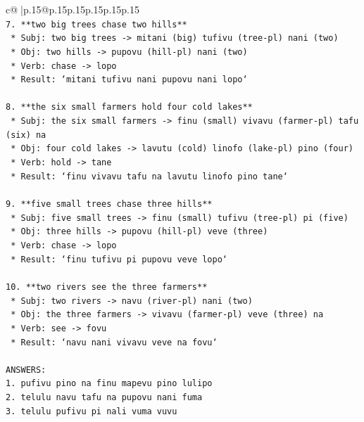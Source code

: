 \documentclass{article}
\begin{document}
{\begin{supertabular}{c@{$\;$}|p{.15\linewidth}@{}p{.15\linewidth}p{.15\linewidth}p{.15\linewidth}p{.15\linewidth}p{.15\linewidth}}
{{{\\ 
\texttt{7.  **two big trees chase two hills**} \\
\texttt{    *   Subj: two big trees {-}> mitani (big) tufivu (tree{-}pl) nani (two)} \\
\texttt{    *   Obj: two hills {-}> pupovu (hill{-}pl) nani (two)} \\
\texttt{    *   Verb: chase {-}> lopo} \\
\texttt{    *   Result: `mitani tufivu nani pupovu nani lopo`} \\
\\ 
\texttt{8.  **the six small farmers hold four cold lakes**} \\
\texttt{    *   Subj: the six small farmers {-}> finu (small) vivavu (farmer{-}pl) tafu (six) na} \\
\texttt{    *   Obj: four cold lakes {-}> lavutu (cold) linofo (lake{-}pl) pino (four)} \\
\texttt{    *   Verb: hold {-}> tane} \\
\texttt{    *   Result: `finu vivavu tafu na lavutu linofo pino tane`} \\
\\ 
\texttt{9.  **five small trees chase three hills**} \\
\texttt{    *   Subj: five small trees {-}> finu (small) tufivu (tree{-}pl) pi (five)} \\
\texttt{    *   Obj: three hills {-}> pupovu (hill{-}pl) veve (three)} \\
\texttt{    *   Verb: chase {-}> lopo} \\
\texttt{    *   Result: `finu tufivu pi pupovu veve lopo`} \\
\\ 
\texttt{10. **two rivers see the three farmers**} \\
\texttt{    *   Subj: two rivers {-}> navu (river{-}pl) nani (two)} \\
\texttt{    *   Obj: the three farmers {-}> vivavu (farmer{-}pl) veve (three) na} \\
\texttt{    *   Verb: see {-}> fovu} \\
\texttt{    *   Result: `navu nani vivavu veve na fovu`} \\
\\ 
\texttt{ANSWERS:} \\
\texttt{1. pufivu pino na finu mapevu pino lulipo} \\
\texttt{2. telulu navu tafu na pupovu nani fuma} \\
\texttt{3. telulu pufivu pi nali vuma vuvu} \\
}}}
\end{supertabular}}
\end{document}
